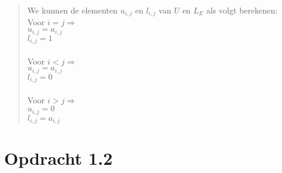 \documentclass[a4paper]{article}
\begin{document}
\pagebreak
\begin{verse}
\begin{tabbing}
We kunnen de elementen $u_{i,j}$ en $ l_{i,j}$ van $U$ en $L_{E}$ als volgt berekenen:
\\Voor $i = j \Rightarrow$  \= 
\\ \>$u_{i,j} =  a_{i,j}$
\\ \>$l_{i,j} =  1$
\\{}
\\Voor $i < j \Rightarrow$
\\ \>$u_{i,j} =  a_{i,j}$
\\ \>$l_{i,j} =  0$
\\{}
\\Voor $i > j  \Rightarrow$ 
\\ \>$u_{i,j} =  0$
\\ \>$l_{i,j} =  a_{i,j}$
\end{tabbing}
\end{verse}
\section{Opdracht 1.2}
\end{document}
